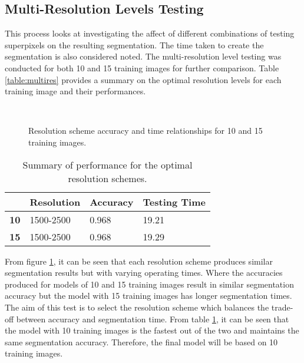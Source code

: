 \subsection{Multi-Resolution Levels Testing}
This process looks at investigating the affect of different combinations of testing superpixels on the resulting segmentation. The time taken to create the segmentation is also considered noted. The multi-resolution level testing was conducted for both 10 and 15 training images for further comparison. Table \ref{table:multires} provides a summary on the optimal resolution levels for each training image and their performances.

\begin{figure}[H]
    \centering
    \\
    \caption{Resolution scheme accuracy and time relationships for 10 and 15 training images.}%
    \label{reg: multires10}
\end{figure}


\begin{table}[H]
\centering
\caption{Summary of performance for the optimal resolution schemes.}

\begin{tabular}{|l|l|l|l|}
\hline
&	\textbf{Resolution} & \textbf{Accuracy} & \textbf{Testing Time}\\
\hline
\textbf{10} & 1500-2500 & 0.968 & 19.21\\
\hline				    	 			
\textbf{15} & 1500-2500 & 0.968 & 19.29\\	
\hline		    	 
\end{tabular}
\label{table:multiresres}
\end{table}

From figure \ref{reg: multires10}, it can be seen that each resolution scheme produces similar segmentation results but with varying operating times. Where the accuracies produced for models of 10 and 15 training images result in similar segmentation accuracy but the model with 15 training images has longer segmentation times. 
\\[1\baselineskip]
The aim of this test is to select the resolution scheme which balances the trade-off between accuracy and segmentation time. From table \ref{table:multiresres}, it can be seen that the model with 10 training images is the fastest out of the two and maintains the same segmentation accuracy. Therefore, the final model will be based on 10 training images. 

